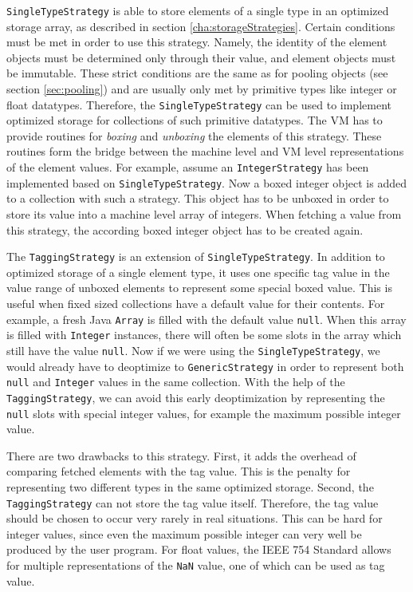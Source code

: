\lstinline{SingleTypeStrategy} is able to store elements of a single type in an optimized storage array, as described in section \ref{cha:storageStrategies}.
Certain conditions must be met in order to use this strategy.
Namely, the identity of the element objects must be determined only through their value, and element objects must be immutable.
These strict conditions are the same as for pooling objects (see section \ref{sec:pooling}) and are usually only met by primitive types like integer or float datatypes.
Therefore, the \lstinline{SingleTypeStrategy} can be used to implement optimized storage for collections of such primitive datatypes.
The VM has to provide routines for \emph{boxing} and \emph{unboxing} the elements of this strategy.
These routines form the bridge between the machine level and VM level representations of the element values.
For example, assume an \lstinline{IntegerStrategy} has been implemented based on \lstinline{SingleTypeStrategy}.
Now a boxed integer object is added to a collection with such a strategy.
This object has to be unboxed in order to store its value into a machine level array of integers.
When fetching a value from this strategy, the according boxed integer object has to be created again.

The \lstinline{TaggingStrategy} is an extension of \lstinline{SingleTypeStrategy}.
In addition to optimized storage of a single element type, it uses one specific tag value in the value range of unboxed elements to represent some special boxed value.
This is useful when fixed sized collections have a default value for their contents.
For example, a fresh Java \lstinline{Array} is filled with the default value \lstinline{null}.
When this array is filled with \lstinline{Integer} instances, there will often be some slots in the array which still have the value \lstinline{null}.
Now if we were using the \lstinline{SingleTypeStrategy}, we would already have to deoptimize to \lstinline{GenericStrategy} in order to represent both \lstinline{null} and \lstinline{Integer} values in the same collection.
With the help of the \lstinline{TaggingStrategy}, we can avoid this early deoptimization by representing the \lstinline{null} slots with special integer values, for example the maximum possible integer value.

There are two drawbacks to this strategy.
First, it adds the overhead of comparing fetched elements with the tag value.
This is the penalty for representing two different types in the same optimized storage.
Second, the \lstinline{TaggingStrategy} can not store the tag value itself.
Therefore, the tag value should be chosen to occur very rarely in real situations.
This can be hard for integer values, since even the maximum possible integer can very well be produced by the user program.
For float values, the IEEE 754 Standard \cite{ieeeFloat} allows for multiple representations of the \lstinline{NaN} value, one of which can be used as tag value.

